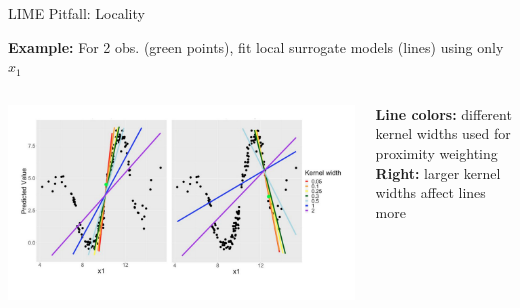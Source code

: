 \documentclass[11pt,compress,t,notes=noshow, aspectratio=169, xcolor=table]{beamer}
\begin{document}
\begin{frame}{LIME Pitfall: Locality}
\begin{itemize}
     \end{itemize}
     \pause
     \textbf{Example:} For 2 obs. (green points), fit local surrogate models (lines) using only \( x_1 \)
     \begin{columns}[T, totalwidth=\textwidth]
        \begin{column}{0.72\textwidth}
        \includegraphics[width=\textwidth, trim = 25px 0px 15px 40px, clip]{figure/lime_locality}
         \end{column}
         \begin{column}{0.28\textwidth}
    \lz
  \textbf{Line colors:} different kernel widths used for proximity weighting\\
  \lz
  \textbf{Right:} larger kernel widths affect lines more

         \end{column}
     \end{columns}
\end{frame}
\end{document}
